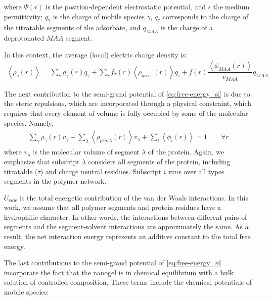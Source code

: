 \documentclass[journal=jacsat,manuscript=suppinfo]{achemso}
\begin{document}
\noindent where $\Psi(r)$ is the position-dependent electrostatic potential, and $\epsilon$ the medium permittivity; 
$q_\gamma$ is the charge of  mobile species $\gamma$, $q_\tau$ corresponds to the charge of the titratable segments of the adsorbate, and  $q_{MAA}$ is the charge of a deprotonated $MAA$ segment.

In this context, the average (local) electric charge density is:
\begin{align}
	\left<\rho_q(r)\right> = \sum_{\gamma } {\rho_\gamma(r) q_\gamma + \sum_\tau{f_\tau(r) \left<\rho_{pro,\tau}(r)\right> q_\tau} +  f(r)\dfrac{\left<\phi_{MAA}(r)\right>}{v_{MAA}}q_{MAA}}
	\label{si:eq:rho_charge}
\end{align}

The next contribution to the semi-grand potential of \cref{eq:free-energy_si} is due to the steric repulsions, which are incorporated through a physical constraint, which requires that every element of volume is fully occupied by some of the molecular species.
Namely, 
\begin{align}
	\begin{aligned}
		\sum_{\gamma}\rho_\gamma(r) v_\gamma + \sum_\lambda{\left<\rho_{pro,\lambda}(r)\right>v_\lambda} + \sum_i{\left<\phi_i(r)\right>} = 1\hspace{2em} \forall r
	\end{aligned}
	\label{si:eq:constraint}
\end{align}
\noindent where $v_\lambda$ is the molecular volume of segment $\lambda$ of the protein.
Again, we emphasize that subscript $\lambda$ considers all segments of the protein, including titratable  ($\tau$) and charge neutral residues.
Subscript $i$ runs over  all types segments in the  polymer network.




$U_{vdw}$ is the total energetic contribution of the van der Waals interactions.
In this work, we assume that all polymer segments and protein residues have a hydrophilic character.
In other words, the interactions between different pairs of segments and the segment-solvent interactions are approximately the same.
As a result, the net interaction energy represents an additive constant to the total free energy.



The last contributions to the semi-grand potential of \cref{eq:free-energy_si} incorporate the fact that the nanogel is in chemical equilibrium with a bulk solution of controlled composition.
These terms include the chemical potentials of mobile species:
\end{document}
